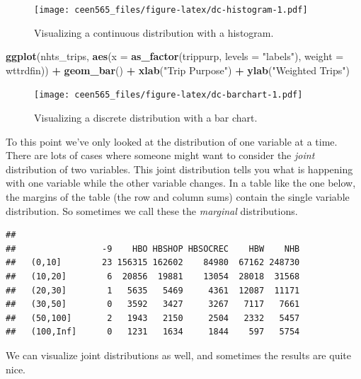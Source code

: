 \documentclass[
]{book}
\newenvironment{Shaded}{\begin{snugshade}}{\end{snugshade}}
\newcommand{\DataTypeTok}[1]{\textcolor[rgb]{0.13,0.29,0.53}{#1}}
\newcommand{\KeywordTok}[1]{\textcolor[rgb]{0.13,0.29,0.53}{\textbf{#1}}}
\newcommand{\NormalTok}[1]{#1}
\newcommand{\OperatorTok}[1]{\textcolor[rgb]{0.81,0.36,0.00}{\textbf{#1}}}
\newcommand{\StringTok}[1]{\textcolor[rgb]{0.31,0.60,0.02}{#1}}
\begin{document}
\begin{figure}
\centering
\texttt{[image: ceen565\_files/figure-latex/dc-histogram-1.pdf]}
\caption{\label{fig:dc-histogram}Visualizing a continuous distribution with a histogram.}
\end{figure}

\begin{Shaded}
\begin{Highlighting}[]
\KeywordTok{ggplot}\NormalTok{(nhts_trips, }\KeywordTok{aes}\NormalTok{(}\DataTypeTok{x =} \KeywordTok{as_factor}\NormalTok{(trippurp, }\DataTypeTok{levels =} \StringTok{"labels"}\NormalTok{), }
                       \DataTypeTok{weight =}\NormalTok{ wttrdfin)) }\OperatorTok{+}
\StringTok{  }\KeywordTok{geom_bar}\NormalTok{() }\OperatorTok{+}\StringTok{ }\KeywordTok{xlab}\NormalTok{(}\StringTok{"Trip Purpose"}\NormalTok{) }\OperatorTok{+}\StringTok{ }\KeywordTok{ylab}\NormalTok{(}\StringTok{"Weighted Trips"}\NormalTok{) }
\end{Highlighting}
\end{Shaded}

\begin{figure}
\centering
\texttt{[image: ceen565\_files/figure-latex/dc-barchart-1.pdf]}
\caption{\label{fig:dc-barchart}Visualizing a discrete distribution with a bar chart.}
\end{figure}

To this point we've only looked at the distribution of one variable at a time.
There are lots of cases where someone might want to consider the \emph{joint}
distribution of two variables. This joint distribution tells you what is happening
with one variable while the other variable changes. In a table like the one below,
the margins of the table (the row and column sums) contain the single variable
distribution. So sometimes we call these the \emph{marginal} distributions.

\begin{verbatim}
##            
##                 -9    HBO HBSHOP HBSOCREC    HBW    NHB
##   (0,10]        23 156315 162602    84980  67162 248730
##   (10,20]        6  20856  19881    13054  28018  31568
##   (20,30]        1   5635   5469     4361  12087  11171
##   (30,50]        0   3592   3427     3267   7117   7661
##   (50,100]       2   1943   2150     2504   2332   5457
##   (100,Inf]      0   1231   1634     1844    597   5754
\end{verbatim}

We can visualize joint distributions as well, and sometimes the results are
quite nice.
\end{document}
